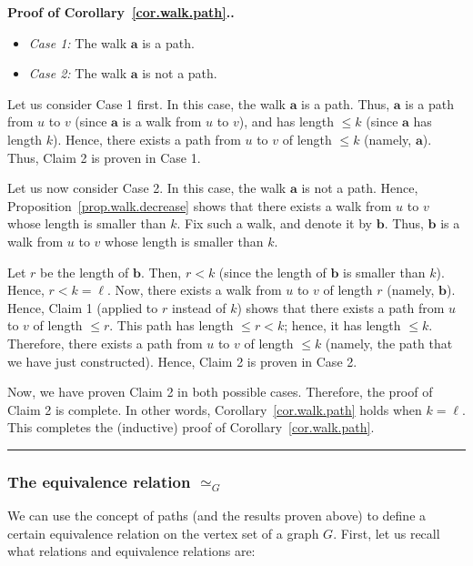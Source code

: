 \documentclass[numbers=enddot,12pt,final,onecolumn,notitlepage]{scrartcl}%
\theoremstyle{definition}
\newenvironment{proof}[1][Proof]{\noindent\textbf{#1.} }{\ \rule{0.5em}{0.5em}}
\begin{document}
\begin{proof}[Proof of Corollary~\ref{cor.walk.path}.]
\begin{itemize}
\item \textit{Case 1:} The walk $\mathbf{a}$ is a path.
\item \textit{Case 2:} The walk $\mathbf{a}$ is not a path.
\end{itemize}

Let us consider Case 1 first. In this case, the walk $\mathbf{a}$ is a
path. Thus, $\mathbf{a}$ is a path from $u$ to $v$ (since $\mathbf{a}$
is a walk from $u$ to $v$), and has length $\leq k$ (since
$\mathbf{a}$ has length $k$). Hence, there exists a path from $u$ to
$v$ of length $\leq k$ (namely, $\mathbf{a}$). Thus, Claim 2 is proven
in Case 1.

Let us now consider Case 2. In this case, the walk $\mathbf{a}$ is not
a path. Hence, Proposition~\ref{prop.walk.decrease} shows that there
exists a walk from $u$ to $v$ whose length is smaller than $k$.
Fix such a walk, and denote it by $\mathbf{b}$. Thus, $\mathbf{b}$ is
a walk from $u$ to $v$ whose length is smaller than $k$.

Let $r$ be the length of $\mathbf{b}$. Then, $r < k$ (since the length
of $\mathbf{b}$ is smaller than $k$). Hence, $r < k = \ell$. Now,
there exists a walk from $u$ to $v$ of length $r$ (namely,
$\mathbf{b}$). Hence, Claim 1 (applied to $r$ instead of $k$) shows
that there exists a path from $u$ to $v$ of length $\leq r$.
This path has length $\leq r < k$; hence, it has length $\leq k$.
Therefore, there exists a path from $u$ to $v$ of length $\leq k$
(namely, the path that we have just constructed). Hence, Claim 2 is
proven in Case 2.

Now, we have proven Claim 2 in both possible cases. Therefore, the
proof of Claim 2 is complete. In other words,
Corollary~\ref{cor.walk.path} holds when $k = \ell$. This completes
the (inductive) proof of Corollary~\ref{cor.walk.path}.
\end{proof}

\subsubsection{The equivalence relation $\simeq_G$}

We can use the concept of paths (and the results proven above) to
define a certain equivalence relation on the vertex set of a graph
$G$. First, let us recall what relations and equivalence relations
are:
\end{document}
